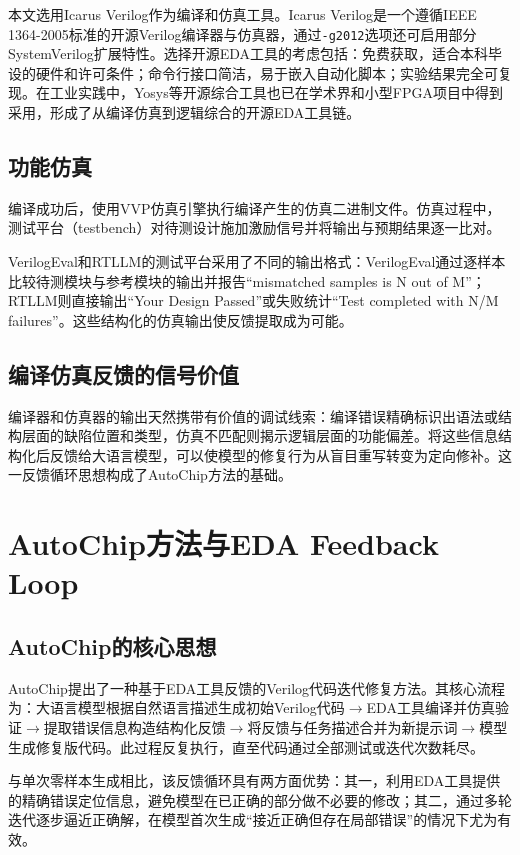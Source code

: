 本文选用Icarus Verilog\cite{iverilog}作为编译和仿真工具。Icarus Verilog是一个遵循IEEE 1364-2005\cite{ieee1364}标准的开源Verilog编译器与仿真器，通过\texttt{-g2012}选项还可启用部分SystemVerilog扩展特性。选择开源EDA工具的考虑包括：免费获取，适合本科毕设的硬件和许可条件；命令行接口简洁，易于嵌入自动化脚本；实验结果完全可复现。在工业实践中，Yosys\cite{yosys}等开源综合工具也已在学术界和小型FPGA项目中得到采用，形成了从编译仿真到逻辑综合的开源EDA工具链。

\subsection{功能仿真}

编译成功后，使用VVP仿真引擎执行编译产生的仿真二进制文件。仿真过程中，测试平台（testbench）对待测设计施加激励信号并将输出与预期结果逐一比对。

VerilogEval和RTLLM的测试平台采用了不同的输出格式：VerilogEval通过逐样本比较待测模块与参考模块的输出并报告``mismatched samples is N out of M''；RTLLM则直接输出``Your Design Passed''或失败统计``Test completed with N/M failures''。这些结构化的仿真输出使反馈提取成为可能。

\subsection{编译仿真反馈的信号价值}

编译器和仿真器的输出天然携带有价值的调试线索：编译错误精确标识出语法或结构层面的缺陷位置和类型，仿真不匹配则揭示逻辑层面的功能偏差。将这些信息结构化后反馈给大语言模型，可以使模型的修复行为从盲目重写转变为定向修补。这一反馈循环思想构成了AutoChip方法的基础。

\section{AutoChip方法与EDA Feedback Loop}

\subsection{AutoChip的核心思想}

AutoChip\cite{autochip}提出了一种基于EDA工具反馈的Verilog代码迭代修复方法。其核心流程为：大语言模型根据自然语言描述生成初始Verilog代码$\rightarrow$EDA工具编译并仿真验证$\rightarrow$提取错误信息构造结构化反馈$\rightarrow$将反馈与任务描述合并为新提示词$\rightarrow$模型生成修复版代码。此过程反复执行，直至代码通过全部测试或迭代次数耗尽。

与单次零样本生成相比，该反馈循环具有两方面优势：其一，利用EDA工具提供的精确错误定位信息，避免模型在已正确的部分做不必要的修改；其二，通过多轮迭代逐步逼近正确解，在模型首次生成``接近正确但存在局部错误''的情况下尤为有效。

